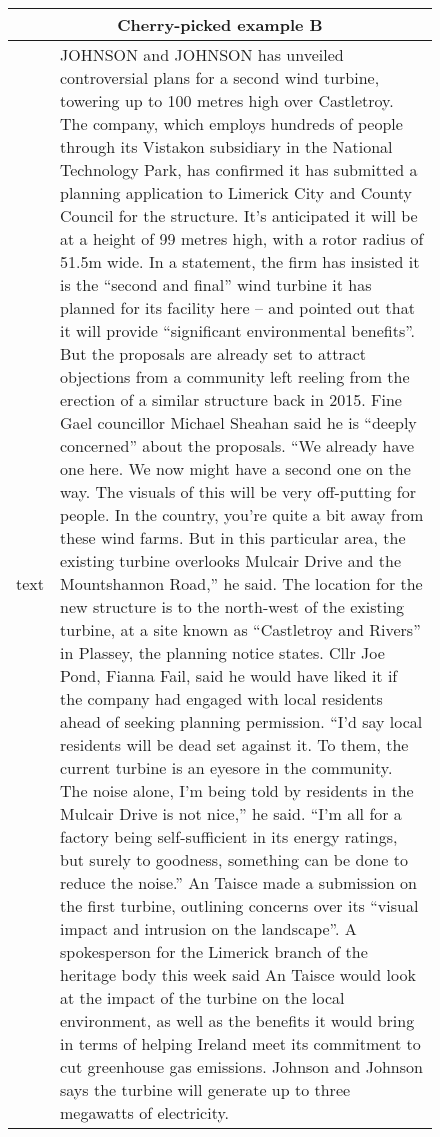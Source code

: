 \documentclass[11pt,a4paper]{article}
\begin{document}
\clearpage
\begin{figure*}[t]
    \centering
    \begin{adjustbox}{width=\textwidth}
    \begin{tabular}{|p{}|p{}|}
    \hline
    \multicolumn{2}{|c|}{\textbf{Cherry-picked example B}} \\
    \hline
    text & JOHNSON and JOHNSON has unveiled controversial plans for a second wind turbine, towering up to 100 metres high over Castletroy. The company, which employs hundreds of people through its Vistakon subsidiary in the National Technology Park, has confirmed it has submitted a planning application to Limerick City and County Council for the structure. It’s anticipated it will be at a height of 99 metres high, with a rotor radius of 51.5m wide. In a statement, the firm has insisted it is the “second and final” wind turbine it has planned for its facility here – and pointed out that it will provide “significant environmental benefits”. But the proposals are already set to attract objections from a community left reeling from the erection of a similar structure back in 2015. Fine Gael councillor Michael Sheahan said he is “deeply concerned” about the proposals. “We already have one here. We now might have a second one on the way. The visuals of this will be very off-putting for people. In the country, you’re quite a bit away from these wind farms. But in this particular area, the existing turbine overlooks Mulcair Drive and the Mountshannon Road,” he said. The location for the new structure is to the north-west of the existing turbine, at a site known as “Castletroy and Rivers” in Plassey, the planning notice states. Cllr Joe Pond, Fianna Fail, said he would have liked it if the company had engaged with local residents ahead of seeking planning permission. “I’d say local residents will be dead set against it. To them, the current turbine is an eyesore in the community. The noise alone, I’m being told by residents in the Mulcair Drive is not nice,” he said. “I’m all for a factory being self-sufficient in its energy ratings, but surely to goodness, something can be done to reduce the noise.” An Taisce made a submission on the first turbine, outlining concerns over its “visual impact and intrusion on the landscape”. A spokesperson for the Limerick branch of the heritage body this week said An Taisce would look at the impact of the turbine on the local environment, as well as the benefits it would bring in terms of helping Ireland meet its commitment to cut greenhouse gas emissions. Johnson and Johnson says the turbine will generate up to three megawatts of electricity.\\

\end{tabular}
\end{adjustbox}
\end{figure*}
\end{document}
